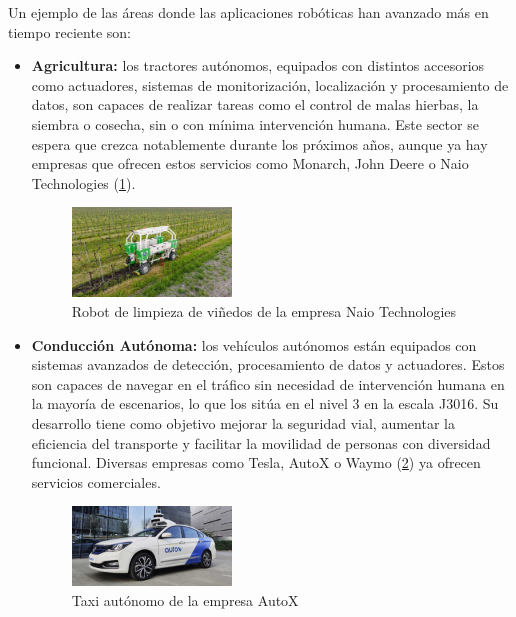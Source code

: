Un ejemplo de las áreas donde las aplicaciones robóticas han avanzado más en tiempo reciente son: 

\begin{itemize}
    \item \textbf{Agricultura:} los tractores autónomos, equipados con distintos accesorios como actuadores, sistemas de monitorización, localización y procesamiento de datos, son capaces de realizar tareas como el control de malas hierbas, la siembra o cosecha, sin o con mínima intervención humana. Este sector se espera que crezca notablemente durante los próximos años, aunque ya hay empresas que ofrecen estos servicios como Monarch, John Deere o Naio Technologies (\ref{fig:agricultura}).
    \begin{figure}[H]
        \centering
        \includegraphics[width=0.4\textwidth]{figures/intro/agricultura.jpg}
        \caption{Robot de limpieza de viñedos de la empresa Naio Technologies}
        \label{fig:agricultura}
    \end{figure}

    \item \textbf{Conducción Autónoma:} los vehículos autónomos están equipados con sistemas avanzados de detección, procesamiento de datos y actuadores. Estos son capaces de navegar en el tráfico sin necesidad de intervención humana en la mayoría de escenarios, lo que los sitúa en el nivel 3 en la escala J3016. Su desarrollo tiene como objetivo mejorar la seguridad vial, aumentar la eficiencia del transporte y facilitar la movilidad de personas con diversidad funcional. Diversas empresas como Tesla, AutoX o Waymo (\ref{fig:autoX}) ya ofrecen servicios comerciales.
    \begin{figure}[H]
        \centering
        \includegraphics[width=0.4\textwidth]{figures/intro/autoX.jpg}
        \caption{Taxi autónomo de la empresa AutoX}
        \label{fig:autoX}
    \end{figure}


\end{itemize}

